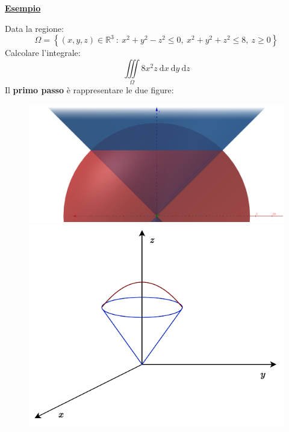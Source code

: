 \documentclass[a4paper]{article}
\newcommand{\example}[1]{\textcolor{Green4}{\textbf{#1}}}
\begin{document}
	\begin{flushleft}\label{esempio coordinate sferiche}
		\example{\underline{Esempio}}
	\end{flushleft}
	Data la regione:
	\begin{equation*}
		\Omega = \left\{\left(x,y,z\right) \in \mathbb{R}^{3} \: : \: x^{2} + y^{2} - z^{2} \le 0,\: x^{2} + y^{2} + z^{2} \le 8,\: z \ge 0\right\}
	\end{equation*}
	Calcolare l'integrale:
	\begin{equation*}
		\displaystyle\iiint\limits_{\Omega} 8x^{2}z \:\mathrm{d}x\:\mathrm{d}y\:\mathrm{d}z
	\end{equation*}
	Il \textbf{primo passo} è rappresentare le due figure:
	\begin{figure}[!htp]
		\centering
		\includegraphics[width=\textwidth]{img/integrazione_per_strati_3.png}
		\includegraphics[width=.7\textwidth]{img/integrazione_per_strati.pdf}
	\end{figure}
	
\end{document}
